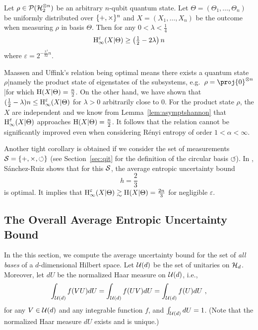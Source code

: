 \begin{corollary}\label{cor:uncertainty}
  Let $\rho \in \mathcal{P}(\mathcal{H}_2^{\otimes n})$
  be an arbitrary $n$-qubit quantum state. Let $\Theta =
  (\Theta_1,\ldots,\Theta_n)$ be uniformly distributed over
  $\{+,\times\}^n$ and $X = (X_1,\ldots,X_n)$ be the outcome
  when measuring $\rho$ in basis $\Theta$. Then for any $0 <
  \lambda < \frac{1}{4}$
$$
\operatorname{H}_{\infty}^{\varepsilon}(X | \Theta) \geq \left(\textstyle\frac{1}{2}
  - 2\lambda \right)n 
$$
where $\varepsilon = 2^{-\frac{\lambda^4}{32}n }$.
\end{corollary}

Maassen and Uffink's relation being optimal means there exists a
quantum state $\rho$|namely the product state of eigenstates of the
subsystems, e.g.~$\rho=\proj{0}^{\otimes n}$|for which $\operatorname{H}(X |
\Theta) = \frac{n}{2}$. On the other hand, we have shown that
$(\frac12 - \lambda)n \leq \operatorname{H}_{\infty}^{\varepsilon}(X | \Theta)$ for $\lambda>0$
arbitrarily close to $0$. For the product state $\rho$, the $X$ are
independent and we know from Lemma~\ref{lem:asymptshannon} that
$\operatorname{H}_{\infty}^{\varepsilon}(X | \Theta)$ approaches $\operatorname{H}(X | \Theta) = \frac{n}{2}$.
It follows that the relation cannot be significantly improved even
when considering R\'enyi entropy of order $1 < \alpha < \infty$. 

Another tight corollary is obtained if we consider the set of
measurements $\mathcal{S}=\{+,\times,\circlearrowleft\}$ (see Section~\ref{sec:qit} 
for the definition of the circular basis $\circlearrowleft$). In \cite{Ruiz93},
S\'anchez-Ruiz shows that for this $\mathcal{S}$, the average entropic
uncertainty bound
\begin{equation} \label{eq:hthreebases}
h=\frac{2}{3}
\end{equation}
is optimal. It implies that
$\operatorname{H}_{\infty}^{\varepsilon}(X| \Theta) \gtrsim \operatorname{H}(X| \Theta) =
\frac{2n}{3}$ for negligible $\varepsilon$. 

\subsection{The Overall Average Entropic Uncertainty Bound}\label{sec:uncertbound}
In the this section, we compute the average uncertainty bound for the
set of \emph{all bases} of a $d$-dimensional Hilbert space. Let
$\mathcal{U}(d)$ be the set of unitaries on $\mathcal{H}_d$.  Moreover, let $d U$ be
the normalized Haar measure on $\mathcal{U}(d)$, i.e.,
\[
  \int_{\mathcal{U}(d)} f(V U) d U 
= 
  \int_{\mathcal{U}(d)} f(U V) d U 
= 
  \int_{\mathcal{U}(d)} f(U) d U \ ,
\]
for any $V \in \mathcal{U}(d)$ and any integrable function $f$, and $\int_{\mathcal{U}(d)} dU = 1$. (Note that the
normalized Haar measure $d U$ exists and is unique.)

